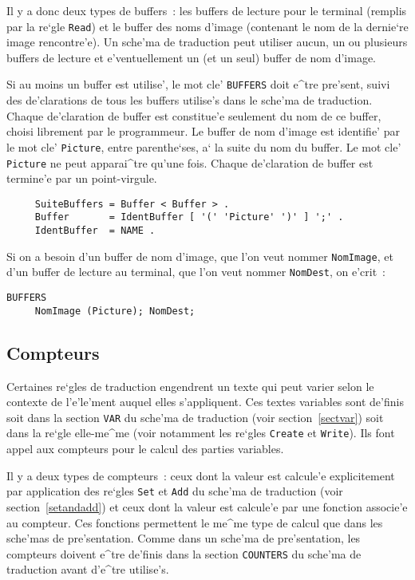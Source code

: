{Il y a donc deux types de buffers~: les buffers de lecture pour le terminal
(remplis par la re`gle {\tt Read}) et le buffer des noms d'image (contenant
le nom de la dernie`re image rencontre'e). Un sche'ma de traduction peut
utiliser aucun, un ou plusieurs buffers de lecture et e'ventuellement un
(et un seul) buffer de nom d'image.

Si au moins un buffer est utilise', le mot cle' {\tt BUFFERS} doit e^tre
pre'sent, suivi des de'clarations de tous les buffers utilise's dans le
sche'ma de traduction. Chaque de'claration de buffer est constitue'e seulement
du nom de ce buffer, choisi librement par le programmeur. Le buffer de nom
d'image est identifie' par le mot cle' {\tt Picture}, entre parenthe`ses, a`
la suite du nom du buffer. Le mot cle' {\tt Picture} ne peut apparai^tre
qu'une fois. Chaque de'claration de buffer est termine'e par un point-virgule.

\begin{verbatim}
     SuiteBuffers = Buffer < Buffer > .
     Buffer       = IdentBuffer [ '(' 'Picture' ')' ] ';' .
     IdentBuffer  = NAME .
\end{verbatim}

\begin{example}
Si on a besoin d'un buffer de nom d'image, que l'on veut nommer {\tt NomImage},
et d'un buffer de lecture au terminal, que l'on veut nommer {\tt NomDest}, on
e'crit~:
\begin{verbatim}
BUFFERS
     NomImage (Picture); NomDest;
\end{verbatim}
\label{nomdest}
\end{example}

\subsection{Compteurs}
\label{compteurs}

Certaines re`gles de traduction engendrent un texte qui peut varier selon le
contexte de l'e'le'ment auquel elles s'appliquent. Ces textes variables sont
de'finis soit dans la section {\tt VAR} du sche'ma de traduction (voir
section~\ref{sectvar}) soit dans la re`gle elle-me^me (voir notamment les
re`gles {\tt Create} et {\tt Write}). Ils font appel aux compteurs pour
le calcul des parties variables.

Il y a deux types de compteurs~: ceux dont la valeur est calcule'e
explicitement par application des re`gles {\tt Set} et {\tt Add} du
sche'ma de traduction (voir section~\ref{setandadd}) et ceux dont la
valeur est calcule'e par une fonction associe'e au compteur. Ces
fonctions permettent le me^me type de calcul que dans les sche'mas de
pre'sentation.
Comme dans un sche'ma de pre'sentation, les compteurs doivent e^tre de'finis
dans la section {\tt COUNTERS} du sche'ma de traduction avant d'e^tre
utilise's.

}

